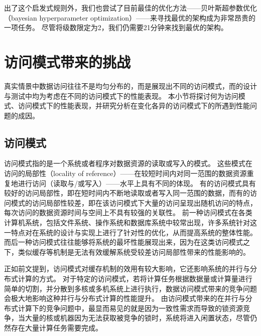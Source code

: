 出了这个启发式规则外，我们也尝试了目前最佳的优化方法{------}贝叶斯超参数优化（bayesian hyperparameter optimization）{------}来寻找最优的{\li}架构成为非常昂贵的一项任务。
尽管将级数限定为2，我们仍需要21分钟来找到最优的架构。


\section{访问模式带来的挑战}

真实情景中数据访问往往不是均匀分布的，而是展现出不同的访问模式，而{\li}的设计与测试中均为考虑在不同的访问模式下的性能表现。
本小节将探讨何为访问模式、访问模式下{\li}的性能表现，并研究分析{\li}在变化各异的访问模式下的所遇到性能问题的成因。

\subsection{访问模式}

访问模式指的是一个系统或者程序对数据资源的读取或写入的模式。
这些模式在访问的局部性（locality of reference）{------}在较短时间内对同一范围的数据资源重复地进行访问（读取与/或写入）{------}水平上具有不同的体现。
有的访问模式具有较好的访问局部性，即在短时间内不断地读取或者写入同一范围的数据，而有的访问模式的访问局部性较差，即在该访问模式下大量的访问呈现出随机访问的特点，
每次访问的数据资源时间与空间上不具有较强的关联性。
前一种访问模式在各类计算机系统，包括文件系统、操作系统和数据库系统中较常出现，许多系统针对这一特点对在系统的设计与实现上进行了针对性的优化，从而提高系统的整体性能。
而后一种访问模式往往能够将系统的最坏性能展现出来，因为在这类访问模式之下，类似缓存等机制是无法有效缓解系统受较差访问局部性带来的性能影响的。

正如前文提到，访问模式对缓存机制的效用有较大影响，它还影响系统的并行与分布式计算的方式。
对于特定的访问模式，若将计算任务根据数据量或计算量进行简单的切割，并分散到多核或多机系统上进行执行，数据访问模式带来的竞争问题会极大地影响这种并行与分布式计算的性能提升。
由访问模式带来的在并行与分布式计算下的竞争问题中，最显而易见的就是因为一致性需求而导致的锁资源竞争，当大量的核或机器因为无法获取被竞争的锁时，系统将进入闲置状态，尽管仍然存在大量计算任务需要完成。

